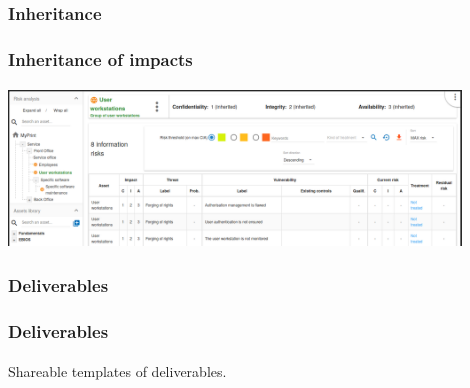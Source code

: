 \subsubsection{Inheritance}
\begin{frame}
    \frametitle{Inheritance of impacts}
    \framesubtitle{}
    \begin{center}
        \begin{center}
            \includegraphics[width=12cm]{../common_pictures/impacts-inheritance.png}
        \end{center}
    \end{center}
\end{frame}

\subsubsection{Deliverables}
\begin{frame}
    \frametitle{Deliverables}
    \framesubtitle{}
    Shareable templates of deliverables.
\end{frame}
